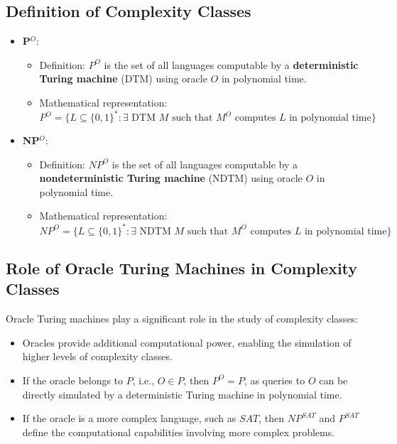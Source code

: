 \documentclass[a4paper]{article}
\begin{document}
\subsection*{Definition of Complexity Classes}
\begin{itemize}
    \item \textbf{P$^O$}:
    \begin{itemize}
        \item Definition: $P^O$ is the set of all languages computable by a \textbf{deterministic Turing machine} (DTM) using oracle $O$ in polynomial time.
        \item Mathematical representation:
        \[
        P^O = \{L \subseteq \{0, 1\}^* : \exists \text{ DTM } M \text{ such that } M^O \text{ computes } L \text{ in polynomial time}\}
        \]
    \end{itemize}
    
    \item \textbf{NP$^O$}:
    \begin{itemize}
        \item Definition: $NP^O$ is the set of all languages computable by a \textbf{nondeterministic Turing machine} (NDTM) using oracle $O$ in polynomial time.
        \item Mathematical representation:
        \[
        NP^O = \{L \subseteq \{0, 1\}^* : \exists \text{ NDTM } M \text{ such that } M^O \text{ computes } L \text{ in polynomial time}\}
        \]
    \end{itemize}
\end{itemize}

\subsection*{Role of Oracle Turing Machines in Complexity Classes}
Oracle Turing machines play a significant role in the study of complexity classes:
\begin{itemize}
    \item Oracles provide additional computational power, enabling the simulation of higher levels of complexity classes.
    \item If the oracle belongs to $P$, i.e., $O \in P$, then $P^O = P$, as queries to $O$ can be directly simulated by a deterministic Turing machine in polynomial time.
    \item If the oracle is a more complex language, such as $SAT$, then $NP^{SAT}$ and $P^{SAT}$ define the computational capabilities involving more complex problems.
\end{itemize}
\end{document}
